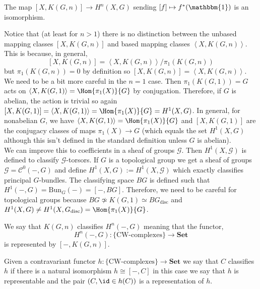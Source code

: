 \documentclass[12pt]{extarticle}
\begin{document}
\begin{theorem}
The map $[X, K(G, n)] \to H^n(X, G)$ sending $[f] \mapsto f^*(\mathbbm{1})$ is an isomorphism. 
\end{theorem}

\begin{rmk}
Notice that (at least for $n > 1$) there is no distinction between the unbased mapping classes $[X, K(G, n)]$ and based mapping classes $\left<X, K(G, n) \right>$. This is because, in general,
\[ [X, K(G, n)] = \left< X, K(G, n) \right> / \pi_1(K(G, n)) \]
but $\pi_1(K(G, n)) = 0$ by definition so $[X, K(G, n)] = \left< X, K(G, n) \right>$. We need to be a bit more careful in the $n = 1$ case. Then $\pi_1(K(G,1)) = G$ acts on $\left< X, K(G, 1) \right> = \Hom{\pi_1(X)}{G}$ by conjugation. Therefore, if $G$ is abelian, the action is trivial so again $[X, K(G, 1)] = \left< X, K(G, 1) \right> = \Hom{\pi_1(X)}{G} = H^1(X, G)$. In general, for nonabelian $G$, we have $\left< X, K(G, 1) \right> = \Hom{\pi_1(X)}{G}$ and $[X, K(G, 1)]$ are the conjugacy classes of maps $\pi_1(X) \to G$ (which equals the set $H^1(X, G)$ although this isn't defined in the standard definition unless $G$ is abelian).
\bigskip\\
We can improve this to coefficients in a sheaf of groups $\mathcal{G}$. Then $H^1(X, \mathcal{G})$ is defined to classify $\mathcal{G}$-torsors. If $G$ is a topological group we get a sheaf of groups $\mathcal{G} = \mathcal{C}^0(-,G)$ and define $H^1(X, G) := H^1(X, \mathcal{G})$ which exactly classifies principal $G$-bundles. The classifying space $BG$ is defined such that $H^1(-, G) = \mathrm{Bun}_G(-) = [-, BG]$. Therefore, we need to be careful for topological groups because $BG \not\simeq K(G,1) \simeq B G_{\text{disc}}$ and $H^1(X, G) \neq H^1(X, G_{\text{disc}}) = \Hom{\pi_1(X)}{G}$.
\end{rmk}

\begin{remark}
We say that $K(G, n)$ classifies $H^n(-,G)$ meaning that the functor,
\[ H^n(-,G) : \{ \text{CW-complexes} \} \to \mathbf{Set} \]
 is represented by $[-, K(G,n)]$.
\end{remark}

\begin{definition}
Given a contravariant functor $h : \{ \text{CW-complexes} \} \to \mathbf{Set}$ we say that $C$ classifies $h$ if there is a natural isomorphism $h \cong [-, C]$ in this case we say that $h$ is representable and the pair $(C, \id \in h(C))$ is a representation of $h$. 
\end{definition}
\end{document}
